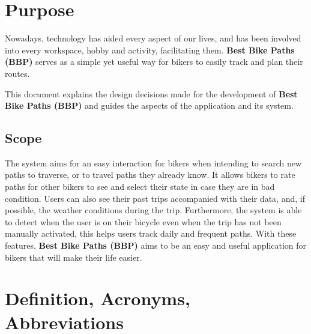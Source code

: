 \section{Purpose}
\label{sec:purpose}%

Nowadays, technology has aided every aspect of our lives, and has been involved into every workspace, hobby and activity, facilitating them. \textbf{Best Bike Paths (BBP)} serves as a simple yet useful way for bikers to easily track and plan their routes. 

This document explains the design decisions made for the development of \textbf{Best Bike Paths (BBP)} and guides the aspects of the application and its system.

\subsection{Scope}
\label{subsec:scope}%

The system aims for an easy interaction for bikers when intending to search new paths to traverse, or to travel paths they already know. It allows bikers to rate paths for other bikers to see and select their state in case they are in bad condition. Users can also see their past trips accompanied with their data, and, if possible, the weather conditions during the trip. Furthermore, the system is able to detect when the user is on their bicycle even when the trip has not been manually activated, this helps users track daily and frequent paths. With these features, \textbf{Best Bike Paths (BBP)} aims to be an easy and useful application for bikers that will make their life easier.

\section{Definition, Acronyms, Abbreviations}
\label{sec:definition_acronyms_abbreviations}%

